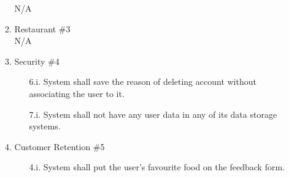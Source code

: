 \documentclass[]{article}
\begin{document}
\begin{enumerate}[{\bf BE1.}]
\begin{enumerate}[{\bf VP1.}]
				N/A
			\item Restaurant \#3 \\
				N/A
			\item Security \#4 
				\begin{enumerate}
					\item [6.i.] System shall save the reason of deleting account without associating the user to it.
					\item [7.i.] System shall not have any user data in any of its data storage systems.
				\end{enumerate}
			\item Customer Retention \#5
				\begin{enumerate}
					\item[4.i.] System shall put the user's favourite food on the feedback form.
				\end{enumerate}
		\end{enumerate}


\end{enumerate}
\end{document}
